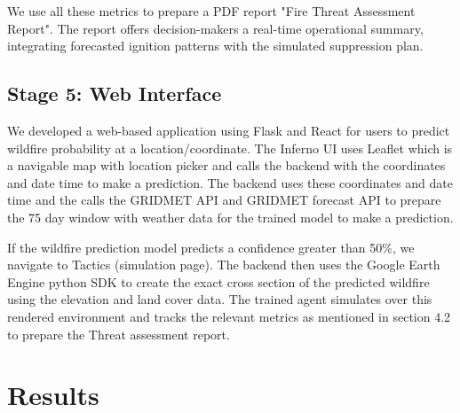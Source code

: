\documentclass[conference]{IEEEtran}
\begin{document}

We use all these metrics to prepare a PDF report "Fire Threat Assessment Report". The report offers decision-makers a real-time operational summary, integrating forecasted ignition patterns with the simulated suppression plan. 





\subsection{Stage 5: Web Interface}
We developed a web-based application using Flask and React for users to predict wildfire probability at a location/coordinate. The Inferno UI uses Leaflet which is a navigable map with location picker and calls the backend with the coordinates and date time to make a prediction. The backend uses these coordinates and date time and the calls the GRIDMET API and GRIDMET forecast API to prepare the 75 day window with weather data for the trained model to make a prediction.

If the wildfire prediction model predicts a confidence greater than 50\%, we navigate to Tactics (simulation page). The backend then uses the Google Earth Engine python SDK to create the exact cross section of the predicted wildfire using the elevation and land cover data. The trained agent simulates over this rendered environment and tracks the relevant metrics as mentioned in section 4.2 to prepare the Threat assessment report.


\section{Results}
\end{document}
